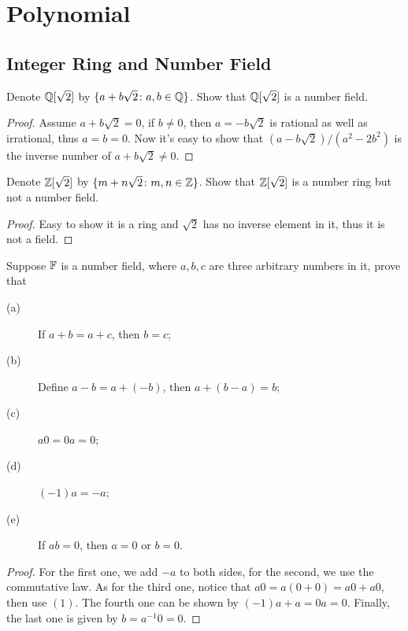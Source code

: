 \chapter{Polynomial}
\section{Integer Ring and Number Field}

\begin{pro}%
Denote $\mathbb{Q}[\sqrt{2}]$ by $\{a+b\sqrt{2}\colon a,b\in\mathbb{Q}\}$. Show that $\mathbb{Q}[\sqrt{2}]$ is a number field.
\end{pro}
\begin{proof}
	Assume $a+b\sqrt{2}=0$, if $b\neq 0$, then $a=-b\sqrt{2}$ is rational as well as irrational, thus $a=b=0$. Now it's easy to show that $(a-b\sqrt{2})/(a^2-2b^2)$ is the inverse number of $a+b\sqrt{2}\neq 0$. 
\end{proof}

\begin{pro}%
	Denote $\mathbb{Z}[\sqrt{2}]$ by $\{m+n\sqrt{2}\colon m,n\in\mathbb{Z}\}$. Show that $\mathbb{Z}[\sqrt{2}]$ is a number ring but not a number field.
\end{pro}
\begin{proof}
	Easy to show it is a ring and $\sqrt{2}$ has no inverse element in it, thus it is not a field.
\end{proof}

\begin{pro}%
	Suppose $\mathbb{F}$ is a number field, where $a,b,c$ are three arbitrary numbers in it, prove that
	\begin{description}
	\item[(a)] If $a+b=a+c$, then $b=c$;
	\item[(b)] Define $a-b=a+(-b)$, then $a+(b-a)=b$;
	\item[(c)] $a0=0a=0$;
	\item[(d)] $(-1)a=-a$;
	\item[(e)] If $ab=0$, then $a=0$ or $b=0$.
	\end{description}
\end{pro}
\begin{proof}
	For the first one, we add $-a$ to both sides, for the second, we use the commutative law. As for the third one, notice that $a0=a(0+0)=a0+a0$, then use $(1)$. The fourth one can be shown by $(-1)a+a=0a=0$. Finally, the last one is given by $b=a^{-1}0=0$.
\end{proof}

